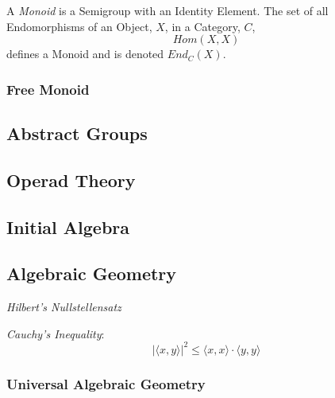 A \emph{Monoid} is a Semigroup with an Identity Element. The set of
all Endomorphisms of an Object, $X$, in a Category, $C$,
\[
    Hom(X,X)
\]
defines a Monoid and is denoted $End_C(X)$.



\subsubsection{Free Monoid}\label{subsec:free_monoid}



\subsection{Abstract Groups}\label{subsec:abstract_groups}
\subsection{Operad Theory}\label{subsec:operad_theory}
\subsection{Initial Algebra}\label{subsec:initial_algebra}

\subsection{Algebraic Geometry}\label{subsec:algebraic_geometry}

\emph{Hilbert's Nullstellensatz}

\emph{Cauchy's Inequality}:
\[
    |\langle x,y \rangle|^2 \leq \langle x,x \rangle \cdot \langle
    y,y \rangle
\]

\subsubsection{Universal Algebraic Geometry}

